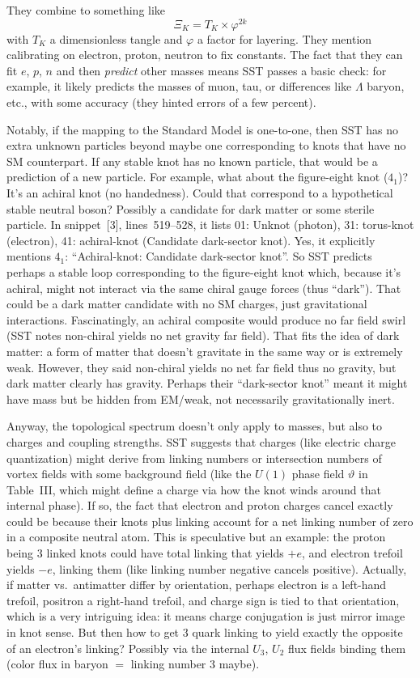 \documentclass[10pt,reprint,aps,onecolumn,nofootinbib]{revtex4-2}
\begin{document}
They combine to something like
\[
\Xi_K = T_K \times \varphi^{2k}
\]
with $T_K$ a dimensionless tangle and $\varphi$ a factor for layering. They mention calibrating on electron, proton, neutron to fix constants. The fact that they can fit $e$, $p$, $n$ and then \emph{predict} other masses means SST passes a basic check: for example, it likely predicts the masses of muon, tau, or differences like $\Lambda$ baryon, etc., with some accuracy (they hinted errors of a few percent).

Notably, if the mapping to the Standard Model is one-to-one, then SST has no extra unknown particles beyond maybe one corresponding to knots that have no SM counterpart. If any stable knot has no known particle, that would be a prediction of a new particle. For example, what about the figure-eight knot ($4_1$)? It's an achiral knot (no handedness). Could that correspond to a hypothetical stable neutral boson? Possibly a candidate for dark matter or some sterile particle. In snippet~[3], lines~519--528, it lists 01: Unknot (photon), 31: torus-knot (electron), 41: achiral-knot (Candidate dark-sector knot). Yes, it explicitly mentions $4_1$: ``Achiral-knot: Candidate dark-sector knot''. So SST predicts perhaps a stable loop corresponding to the figure-eight knot which, because it's achiral, might not interact via the same chiral gauge forces (thus ``dark''). That could be a dark matter candidate with no SM charges, just gravitational interactions. Fascinatingly, an achiral composite would produce no far field swirl (SST notes non-chiral yields no net gravity far field). That fits the idea of dark matter: a form of matter that doesn't gravitate in the same way or is extremely weak. However, they said non-chiral yields no net far field thus no gravity, but dark matter clearly has gravity. Perhaps their ``dark-sector knot'' meant it might have mass but be hidden from EM/weak, not necessarily gravitationally inert.

Anyway, the topological spectrum doesn't only apply to masses, but also to charges and coupling strengths. SST suggests that charges (like electric charge quantization) might derive from linking numbers or intersection numbers of vortex fields with some background field (like the $U(1)$ phase field $\vartheta$ in Table~III, which might define a charge via how the knot winds around that internal phase). If so, the fact that electron and proton charges cancel exactly could be because their knots plus linking account for a net linking number of zero in a composite neutral atom. This is speculative but an example: the proton being 3 linked knots could have total linking that yields $+e$, and electron trefoil yields $-e$, linking them (like linking number negative cancels positive). Actually, if matter vs.\ antimatter differ by orientation, perhaps electron is a left-hand trefoil, positron a right-hand trefoil, and charge sign is tied to that orientation, which is a very intriguing idea: it means charge conjugation is just mirror image in knot sense. But then how to get 3 quark linking to yield exactly the opposite of an electron's linking? Possibly via the internal $U_3$, $U_2$ flux fields binding them (color flux in baryon $=$ linking number 3 maybe).
\end{document}
